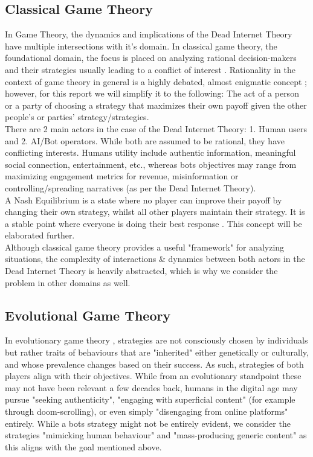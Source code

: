 \documentclass{article}
\begin{document}
\subsection{Classical Game Theory}
In Game Theory, the dynamics and implications of the Dead Internet Theory have multiple intersections with it's domain. In classical game theory, the foundational domain, the focus is placed on analyzing rational decision-makers and their strategies usually leading to a conflict of interest \cite{game_theory_definition}. Rationality in the context of game theory in general is a highly debated, almost enigmatic concept \cite{rationality_game_theory}; however, for this report we will simplify it to the following: The act of a person or a party of choosing a strategy that maximizes their own payoff given the other people's or parties' strategy/strategies. \\

There are 2 main actors in the case of the Dead Internet Theory: 1. Human users and 2. AI/Bot operators. While both are assumed to be rational, they have conflicting interests. Humans utility include authentic information, meaningful social connection, entertainment, etc., whereas bots objectives may range from maximizing engagement metrics for revenue, misinformation or controlling/spreading narratives (as per the Dead Internet Theory).\\
A Nash Equilibrium is a state where no player can improve their payoff by changing their own strategy, whilst all other players maintain their strategy. It is a stable point where everyone is doing their best response \cite{green_beards}.  This concept will be elaborated further.\\

Although classical game theory provides a useful "framework" for analyzing situations, the complexity of interactions \& dynamics between both actors in the Dead Internet Theory is heavily abstracted, which is why we consider the problem in other domains as well.

\subsection{Evolutional Game Theory}
In evolutionary game theory \cite{EGT_slides}, strategies are not consciously chosen by individuals but rather traits of behaviours that are "inherited" either genetically or culturally, and whose prevalence changes based on their success. As such, strategies of both players align with their objectives. While from an evolutionary standpoint these may not have been relevant a few decades back, humans in the digital age may pursue "seeking authenticity", "engaging with superficial content" (for example through doom-scrolling), or even simply "disengaging from online platforms" entirely. While a bots strategy might not be entirely evident, we consider the strategies "mimicking human behaviour" and "mass-producing generic content" as this aligns with the goal mentioned above.
\end{document}
